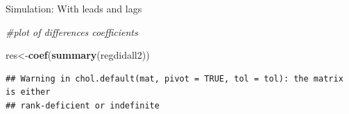 \documentclass[
  ignorenonframetext,
]{beamer}
\newenvironment{Shaded}{\begin{snugshade}}{\end{snugshade}}
\newcommand{\AttributeTok}[1]{\textcolor[rgb]{0.13,0.29,0.53}{#1}}
\newcommand{\CommentTok}[1]{\textcolor[rgb]{0.56,0.35,0.01}{\textit{#1}}}
\newcommand{\DecValTok}[1]{\textcolor[rgb]{0.00,0.00,0.81}{#1}}
\newcommand{\FloatTok}[1]{\textcolor[rgb]{0.00,0.00,0.81}{#1}}
\newcommand{\FunctionTok}[1]{\textcolor[rgb]{0.13,0.29,0.53}{\textbf{#1}}}
\newcommand{\NormalTok}[1]{#1}
\newcommand{\OtherTok}[1]{\textcolor[rgb]{0.56,0.35,0.01}{#1}}
\newcommand{\SpecialCharTok}[1]{\textcolor[rgb]{0.81,0.36,0.00}{\textbf{#1}}}
\newcommand{\StringTok}[1]{\textcolor[rgb]{0.31,0.60,0.02}{#1}}
\begin{document}
\begin{frame}[fragile]{Simulation: With leads and lags}
\protect\hypertarget{simulation-with-leads-and-lags-6}{}
\tiny

\begin{Shaded}
\begin{Highlighting}[]
\CommentTok{\#plot of differences coefficients}

\NormalTok{res}\OtherTok{\textless{}{-}}\FunctionTok{coef}\NormalTok{(}\FunctionTok{summary}\NormalTok{(regdidall2))}
\end{Highlighting}
\end{Shaded}

\begin{verbatim}
## Warning in chol.default(mat, pivot = TRUE, tol = tol): the matrix is either
## rank-deficient or indefinite
\end{verbatim}

\begin{Shaded}
\end{Shaded}
\end{frame}
\end{document}
